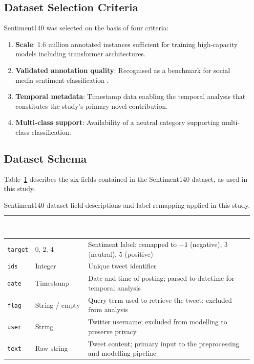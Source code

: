 \subsection{Dataset Selection Criteria}

Sentiment140 was selected on the basis of four criteria:

\begin{enumerate}
  \item \textbf{Scale}: 1.6 million annotated instances sufficient for training high-capacity models including transformer architectures.
  \item \textbf{Validated annotation quality}: Recognised as a benchmark for social media sentiment classification \citep{pak2010twitter}.
  \item \textbf{Temporal metadata}: Timestamp data enabling the temporal analysis that constitutes the study's primary novel contribution.
  \item \textbf{Multi-class support}: Availability of a neutral category supporting multi-class classification.
\end{enumerate}

\subsection{Dataset Schema}

Table~\ref{tab:dataset} describes the six fields contained in the Sentiment140 dataset, as used in this study.

\begin{table}[H]
\centering
\caption{Sentiment140 dataset field descriptions and label remapping applied in this study.}
\label{tab:dataset}
\begin{tabularx}{\linewidth}{llX}
  \toprule
  \rowcolor{uwsblue!90}
  \textcolor{white}{\textbf{Field}} & \textcolor{white}{\textbf{Original Values}} & \textcolor{white}{\textbf{Description / Remapping}} \\
  \midrule
  \rowcolor{tablegrey}
  \texttt{target}  & 0, 2, 4       & Sentiment label; remapped to $-1$ (negative), $3$ (neutral), $5$ (positive) \\
  \texttt{ids}     & Integer        & Unique tweet identifier \\
  \rowcolor{tablegrey}
  \texttt{date}    & Timestamp      & Date and time of posting; parsed to datetime for temporal analysis \\
  \texttt{flag}    & String / empty & Query term used to retrieve the tweet; excluded from analysis \\
  \rowcolor{tablegrey}
  \texttt{user}    & String         & Twitter username; excluded from modelling to preserve privacy \\
  \texttt{text}    & Raw string     & Tweet content; primary input to the preprocessing and modelling pipeline \\
  \bottomrule
\end{tabularx}
\end{table}

